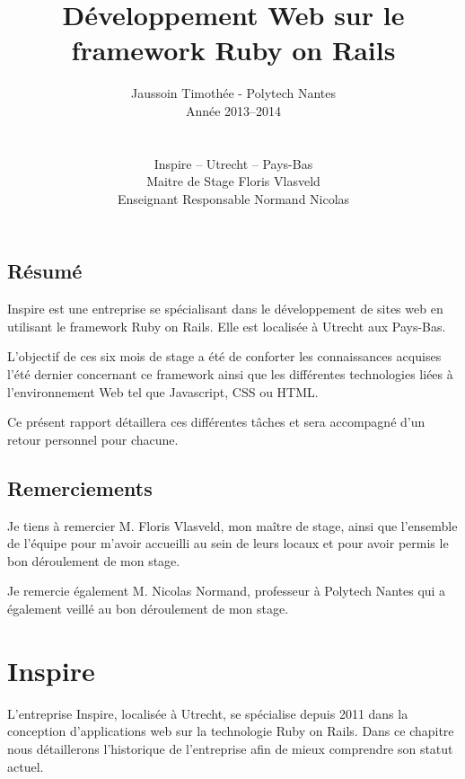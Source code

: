 \documentclass[12pt,a4paper]{book}
\author{Jaussoin Timothée - Polytech Nantes\\ Année 2013--2014 \\
\\ \\ Inspire -- Utrecht -- Pays-Bas\\  Maitre de Stage Floris Vlasveld\\ Enseignant Responsable Normand Nicolas}
\title{Développement Web sur le framework Ruby on Rails}
\begin{document}
\begin{titlepage}
	\maketitle
\end{titlepage}

\tableofcontents

\newpage
\clearpage
{}
    \section*{Résumé}
  Inspire est une entreprise se spécialisant dans le développement de sites web en utilisant le framework Ruby on Rails. Elle est localisée à Utrecht aux Pays-Bas.
  
  L'objectif de ces six mois de stage a été de conforter les connaissances acquises l'été dernier concernant ce framework ainsi que les différentes technologies liées à l'environnement Web tel que Javascript, CSS ou HTML.

    Ce présent rapport détaillera ces différentes tâches et sera accompagné d'un retour personnel pour chacune.  

\newpage
\clearpage
{}
\section*{Remerciements}

Je tiens à remercier M. Floris Vlasveld, mon maître de stage, ainsi que l'ensemble de l'équipe pour m'avoir accueilli au sein de leurs locaux et pour avoir permis le bon déroulement de mon stage.

Je remercie également M. Nicolas Normand, professeur à Polytech Nantes qui a également veillé au bon déroulement de mon stage.


\chapter{Inspire}

L'entreprise Inspire, localisée à Utrecht, se spécialise depuis 2011 dans la conception d'applications web sur la technologie Ruby on Rails. Dans ce chapitre nous détaillerons l'historique de l'entreprise afin de mieux comprendre son statut actuel.
\end{document}
